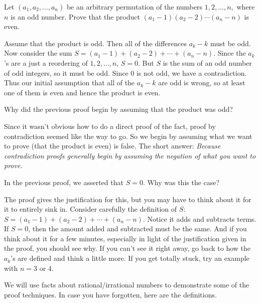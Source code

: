 \begin{exa}
Let $(a_1, a_2, \ldots, a_n)$ be an arbitrary
permutation of the numbers $1, 2, \ldots , n, $ where $n$ is an odd number. Prove
that the product $(a_1 - 1)(a_2 - 2)\cdots (a_n - n)$ is even.
\begin{pf}
Assume that the product is odd. Then all of the differences $a_k -
k$ must be odd. Now consider the sum
$S = (a_1 - 1) + (a_2 - 2) + \cdots + (a_n - n).$ 
Since the $a_k$'s are a just a 
reordering of $1, 2, \ldots , n$, $S=0$.
But $S$ is the sum of an odd  number of odd integers, so it must be odd. Since $0$ is not odd, we have
a contradiction.  Thus our initial assumption that all of the $a_k - k$ are odd
is wrong, so at least one of them is even and hence the product is even.
\end{pf}
\end{exa}

\begin{ques}
Why did the previous proof begin by assuming that the product was odd?\\
\answerlinethree
\begin{answer}
Since it wasn't obvious how to do a direct proof of the fact, proof by contradiction seemed like
the way to go.  So we begin by assuming what we want to prove (that the product is even) is false.
The short answer: {\em Because contradiction proofs generally begin by assuming the negation of what
you want to prove.}
\end{answer}
\end{ques}

\begin{ques}
In the previous proof, we asserted that $S=0$.  Why was this the case?\\
\answerlinethree
\begin{answer}
The proof gives the justification for this, but you may have to think about it
for it to entirely sink in.  
Consider carefully the definition of $S$:
$S = (a_1 - 1) + (a_2 - 2) + \cdots + (a_n - n).$ 
Notice it adds and subtracts terms.  If $S=0$, then the amount added and subtracted
must be the same.  And if you think about it for a few minutes, especially in light
of the justification given in the proof, you should see why.
If you can't see it right away, go back to how the $a_k$'s are defined and think a little more.
If you get totally stuck, try an example with $n=3$ or $4$.
\end{answer}
\end{ques}

We will use facts about rational/irrational numbers to demonstrate some of the proof techniques.
In case you have forgotten, here are the definitions.


